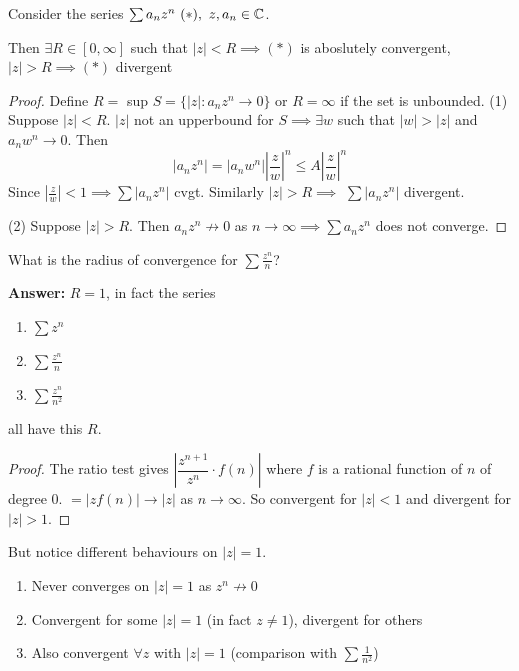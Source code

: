 \documentclass[twoside]{scrartcl}
\begin{document}
\vspace*{10pt}
\begin{theorem}
	Consider the series $\sum a_nz^n ~(*),~ z,a_n \in\mathbb{C}$. 
	
	Then $\exists R \in [0,\infty]$ such that $|z| < R \implies (*)$ is aboslutely convergent, $|z| > R \implies (*)$ divergent
\end{theorem}

\begin{proof}
Define $R =$ sup $S = \{|z| : a_nz^n \to 0\}$	 or $R = \infty$ if the set is unbounded. (1) Suppose $|z| < R$. $|z|$ not an upperbound for $S \implies \exists w$ such that $|w| > |z|$ and $a_nw^n \to 0.$ Then \[|a_nz^n| = |a_nw^n|\left|\frac{z}{w}\right|^n \leq A\left|\frac{z}{w}\right|^n\] Since $\left|\frac{z}{w}\right| < 1 \implies \sum|a_nz^n|$ cvgt. Similarly $|z| >R  \implies$ $\sum |a_nz^n|$ divergent. 

(2) Suppose $|z| > R$. Then $a_nz^n \not\to 0$ as $n \to \infty \implies \sum a_nz^n$ does not converge.
\end{proof}\vspace*{5pt}

\begin{clicker}
What is the radius of convergence for $\sum \frac{z^n}{n}$? 

\textbf{Answer:} $R = 1$, in fact the series
\begin{enumerate}
\item $\sum z^n$
\item $\sum \frac{z^n}{n}$
\item $\sum \frac{z^n}{n^2}$	
\end{enumerate}
all have this $R$.

\begin{proof}
The ratio test gives  $\left|\dfrac{z^{n+1}}{z^n}\cdot f(n)\right|$ where $f$ is a rational function of $n$ of degree $0$. $= |zf(n)| \to |z|$ as $n \to \infty$. So convergent for $|z| < 1$ and divergent for $|z| > 1$.  	
\end{proof}

But notice different behaviours on $|z| = 1$. \begin{enumerate}
 \item Never converges on $|z| = 1$ as $z^n \not\to 0$
 \item Convergent for some $|z| = 1$ (in fact $z \neq 1$), divergent for others
 \item Also convergent $\forall z$ with $|z|  =1$ (comparison with $\sum \frac{1}{n^2}$)	
 \end{enumerate}
\end{clicker}\vspace*{5pt}
\end{document}
